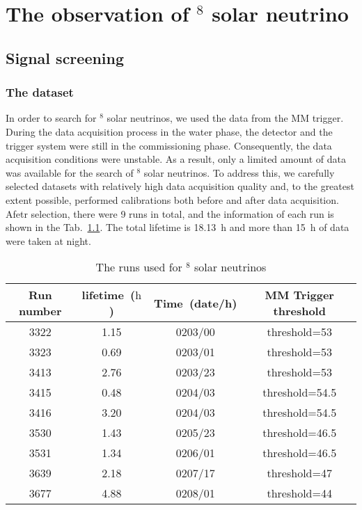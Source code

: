 \chapter{The observation of $^8$ solar neutrino}
\label{chap:solar}

\section{Signal screening}
\label{sec:signal_screening}
\subsection{The dataset}
In order to search for $^8$ solar neutrinos, we used the data from the MM trigger. During the data acquisition process in the water phase, the detector and the trigger system were still in the commissioning phase. Consequently, the data acquisition conditions were unstable. As a result, only a limited amount of data was available for the search of $^8$ solar neutrinos. To address this, we carefully selected datasets with relatively high data acquisition quality and, to the greatest extent possible, performed calibrations both before and after data acquisition. Afetr selection, there were 9 runs in total, and the information of each run is shown in the Tab.~\ref{tab:summaryOfRuns_solar}. The total lifetime is \SI{18.13}{h} and more than \SI{15}{h} of data were taken at night.
\begin{table}[htbp]
	\centering
	\caption{The runs used for $^8$ solar neutrinos}%
	\label{tab:summaryOfRuns_solar}
	\begin{tabular}{cccc}
		\toprule
		Run number & lifetime~($\text{h}$) & Time~(date/h) & MM Trigger threshold \\
		\midrule
		3322       & 1.15                  & 0203/00       & threshold=53         \\
		3323       & 0.69                  & 0203/01       & threshold=53         \\
		3413       & 2.76                  & 0203/23       & threshold=53         \\
		3415       & 0.48                  & 0204/03       & threshold=54.5       \\
		3416       & 3.20                  & 0204/03       & threshold=54.5       \\
		3530       & 1.43                  & 0205/23       & threshold=46.5       \\
		3531       & 1.34                  & 0206/01       & threshold=46.5       \\
		3639       & 2.18                  & 0207/17       & threshold=47         \\
		3677       & 4.88                  & 0208/01       & threshold=44         \\
		\bottomrule
	\end{tabular}
\end{table}

